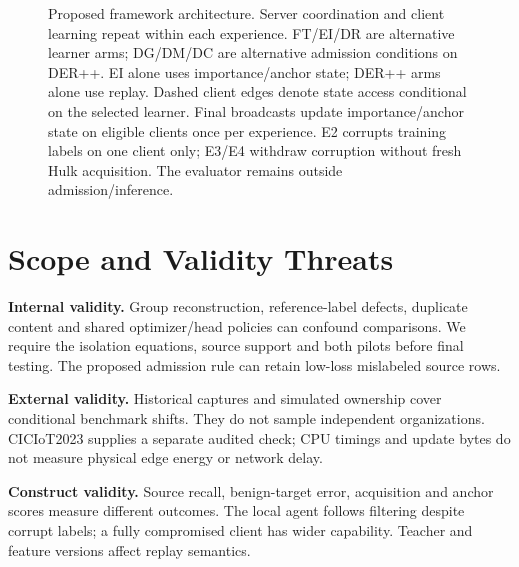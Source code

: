 \documentclass[10pt,a4paper]{article}
\begin{document}
\begin{figure}[htbp]
{
}
\caption{Proposed framework architecture. Server coordination and client learning repeat within each experience. FT/EI/DR are alternative learner arms; DG/DM/DC are alternative admission conditions on DER++. EI alone uses importance/anchor state; DER++ arms alone use replay. Dashed client edges denote state access conditional on the selected learner. Final broadcasts update importance/anchor state on eligible clients once per experience. E2 corrupts training labels on one client only; E3/E4 withdraw corruption without fresh Hulk acquisition. The evaluator remains outside admission/inference.}
\label{fig:framework}
\end{figure}

\section{Scope and Validity Threats}
\textbf{Internal validity.} Group reconstruction, reference-label defects, duplicate content and shared optimizer/head policies can confound comparisons. We require the isolation equations, source support and both pilots before final testing. The proposed admission rule can retain low-loss mislabeled source rows.

\textbf{External validity.} Historical captures and simulated ownership cover conditional benchmark shifts. They do not sample independent organizations. CICIoT2023 supplies a separate audited check; CPU timings and update bytes do not measure physical edge energy or network delay.

\textbf{Construct validity.} Source recall, benign-target error, acquisition and anchor scores measure different outcomes. The local agent follows filtering despite corrupt labels; a fully compromised client has wider capability. Teacher and feature versions affect replay semantics.
\end{document}
